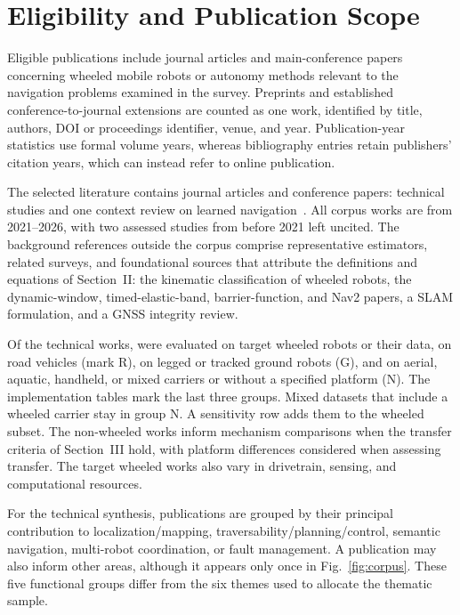 \documentclass[journal]{IEEEtran}
\begin{document}
\section{Eligibility and Publication Scope}
\label{supp:eligibility}

Eligible publications include journal articles and main-conference papers concerning wheeled mobile robots or autonomy methods relevant to the navigation problems examined in the survey. Preprints and established conference-to-journal extensions are counted as one work, identified by title, authors, DOI or proceedings identifier, venue, and year. Publication-year statistics use formal volume years, whereas bibliography entries retain publishers' citation years, which can instead refer to online publication.

The selected literature contains \JournalCount{} journal articles and \ConferenceCount{} conference papers: \CoreCount{} technical studies and one context review on learned navigation~\cite{P_X04}. All corpus works are from 2021--2026, with two assessed studies from before 2021 left uncited. The \BackgroundCount{} background references outside the corpus comprise representative estimators, related surveys, and foundational sources that attribute the definitions and equations of Section~II: the kinematic classification of wheeled robots, the dynamic-window, timed-elastic-band, barrier-function, and Nav2 papers, a SLAM formulation, and a GNSS integrity review.

Of the \CoreCount{} technical works, \GroupWHL{} were evaluated on target wheeled robots or their data, \GroupROAD{} on road vehicles (mark R), \GroupGND{} on legged or tracked ground robots (G), and \GroupOTH{} on aerial, aquatic, handheld, or mixed carriers or without a specified platform (N). The implementation tables mark the last three groups. Mixed datasets that include a wheeled carrier stay in group N. A sensitivity row adds them to the wheeled subset. The non-wheeled works inform mechanism comparisons when the transfer criteria of Section~III hold, with platform differences considered when assessing transfer. The target wheeled works also vary in drivetrain, sensing, and computational resources.

For the technical synthesis, publications are grouped by their principal contribution to localization/mapping, traversability/planning/control, semantic navigation, multi-robot coordination, or fault management. A publication may also inform other areas, although it appears only once in Fig.~\ref{fig:corpus}. These five functional groups differ from the six themes used to allocate the thematic sample.
\end{document}
